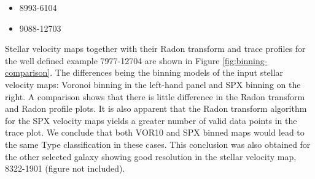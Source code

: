 \begin{itemize}
    \item 8993-6104
    \item 9088-12703
\end{itemize}

Stellar velocity maps together with their Radon transform and trace profiles for the well defined example 7977-12704 are shown in Figure \ref{fig:binning-comparison}. The differences being the binning models of the input stellar velocity maps: Voronoi binning in the left-hand panel and SPX binning on the right. A comparison shows that there is little difference in the Radon transform and Radon profile plots. It is also apparent that the Radon transform algorithm for the SPX velocity maps yields a greater number of valid data points in the trace plot. We conclude that both VOR10 and SPX binned maps would lead to the same Type classification in these cases. This conclusion was also obtained for the other selected galaxy showing good resolution in the stellar velocity map, 8322-1901 (figure not included). 

